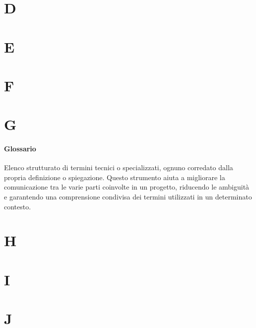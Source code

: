 \documentclass[italian,12pt]{article} %
\begin{document}
\newpage

\section{D}



\newpage

\section{E}



\newpage

\section{F}



\newpage

\section{G}
\paragraph{Glossario} Elenco strutturato di termini tecnici o specializzati, ognuno corredato dalla propria definizione o spiegazione. Questo strumento aiuta a migliorare la comunicazione tra le varie parti coinvolte in un progetto, riducendo le ambiguità e garantendo una comprensione condivisa dei termini utilizzati in un determinato contesto.


\newpage

\section{H}



\newpage

\section{I}



\newpage

\section{J}
\end{document}
